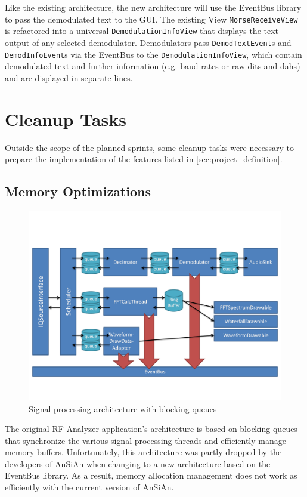 Like the existing architecture, the new architecture will use the EventBus
library to pass the demodulated text to the \ac{GUI}. The existing View
\texttt{MorseReceiveView} is refactored into a universal
\texttt{De\-mo\-du\-la\-tion\-In\-fo\-View} that displays the text output of any selected 
demodulator. Demodulators pass \texttt{DemodTextEvent}s and 
\texttt{DemodInfoEvent}s via the EventBus to the \texttt{De\-mo\-du\-la\-tion\-In\-fo\-View}, 
which contain demodulated text and further information (e.g. baud rates or raw 
dits and dahs) and are displayed in separate lines.

\section{Cleanup Tasks\label{sec:cleanup}}

Outside the scope of the planned sprints, some cleanup tasks were necessary
to prepare the implementation of the features listed in
\autoref{sec:project_definition}.

\subsection{Memory Optimizations\label{sec:cleanup.mem}}

\begin{figure}
	\centering
	\includegraphics[width=1\linewidth]{gfx/queue_arch}
	\caption{Signal processing architecture with blocking queues}
	\label{fig:queue_architecture}
\end{figure}

The original RF Analyzer application's architecture is based on
blocking queues that synchronize the various signal processing threads
and efficiently manage memory buffers. Unfortunately, this
architecture was partly dropped by the developers of \ac{AnSiAn} when
changing to a new architecture based on the EventBus library. As a result, memory
allocation management does not work as efficiently with the current version
of \ac{AnSiAn}.

